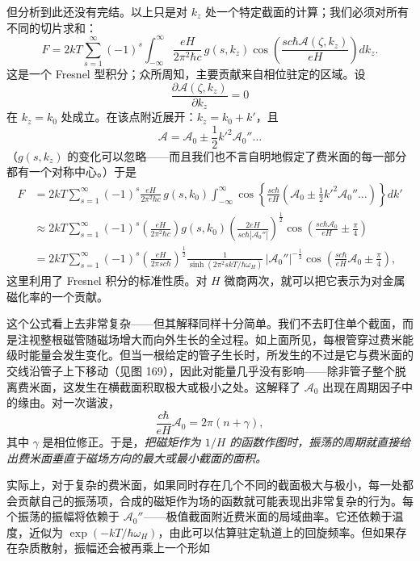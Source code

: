 但分析到此还没有完结。以上只是对 $k_{z}$ 处一个特定截面的计算；我们必须对所有不同的切片求和：
\begin{equation*}
F=2kT\sum_{s=1}^{\infty}(-1)^{s}\int_{-\infty}^{\infty}\frac{eH}{2\pi^{2}\hbar c}\,g(s,k_{z})\cos\left(\frac{sc\hbar\mathcal{A}(\zeta,k_{z})}{eH}\right)dk_{z}.
\tag{9.89}
\end{equation*}
这是一个 Fresnel 型积分；众所周知，主要贡献来自相位驻定的区域。设
\begin{equation*}
\frac{\partial\mathcal{A}(\zeta,k_{z})}{\partial k_{z}}=0
\tag{9.90}
\end{equation*}
在 $k_{z}=k_{0}$ 处成立。在该点附近展开：$k_{z}=k_{0}+k'$，且
\begin{equation*}
\mathcal{A}=\mathcal{A}_{0}\pm\frac{1}{2}k'^{2}\mathcal{A}_{0}''\dots
\tag{9.91}
\end{equation*}
（$g(s,k_{z})$ 的变化可以忽略——而且我们也不言自明地假定了费米面的每一部分都有一个对称中心。）于是
\begin{align*}
F&=2kT\sum_{s=1}^{\infty}(-1)^{s}\frac{eH}{2\pi^{2}\hbar c}\,g(s,k_{0})\int_{-\infty}^{\infty}\cos\left\{\frac{sc\hbar}{eH}\left(\mathcal{A}_{0}\pm\frac{1}{2}k'^{2}\mathcal{A}_{0}''\dots\right)\right\}dk'\\
&\approx 2kT\sum_{s=1}^{\infty}(-1)^{s}\left(\frac{eH}{2\pi^{2}\hbar c}\right)g(s,k_{0})\left(\frac{2eH}{sc\hbar|\mathcal{A}_{0}''|}\right)^{\frac{1}{2}}\cos\left(\frac{sc\hbar\mathcal{A}_{0}}{eH}\pm\frac{\pi}{4}\right)\\
&=2kT\sum_{s=1}^{\infty}(-1)^{s}\left(\frac{eH}{2\pi sc\hbar}\right)^{\frac{1}{2}}\frac{1}{\sinh\left(2\pi^{2}skT/\hbar\omega_{H}\right)}\,|\mathcal{A}_{0}''|^{-\frac{1}{2}}\cos\left(\frac{sc\hbar}{eH}\mathcal{A}_{0}\pm\frac{\pi}{4}\right),
\tag{9.92}
\end{align*}
这里利用了 Fresnel 积分的标准性质。对 $H$ 微商两次，就可以把它表示为对金属磁化率的一个贡献。

这个公式看上去非常复杂——但其解释同样十分简单。我们不去盯住单个截面，而是注视整根磁管随磁场增大而向外生长的全过程。如上面所见，每根管穿过费米能级时能量会发生变化。但当一根给定的管子生长时，所发生的不过是它与费米面的交线沿管子上下移动（见图 169），因此对能量几乎没有影响——除非管子整个脱离费米面，这发生在横截面积取极大或极小之处。这解释了 $\mathcal{A}_{0}$ 出现在周期因子中的缘由。对一次谐波，
\begin{equation*}
\frac{c\hbar}{eH}\mathcal{A}_{0}=2\pi(n+\gamma),
\tag{9.93}
\end{equation*}
其中 $\gamma$ 是相位修正。于是，\emph{把磁矩作为 $1/H$ 的函数作图时，振荡的周期就直接给出费米面垂直于磁场方向的最大或最小截面的面积。}

实际上，对于复杂的费米面，如果同时存在几个不同的截面极大与极小，每一处都会贡献自己的振荡项，合成的磁矩作为场的函数就可能表现出非常复杂的行为。每个振荡的振幅将依赖于 $\mathcal{A}_{0}''$——极值截面附近费米面的局域曲率。它还依赖于温度，近似为 $\exp(-kT/\hbar\omega_{H})$，由此可以估算驻定轨道上的回旋频率。但如果存在杂质散射，振幅还会被再乘上一个形如
